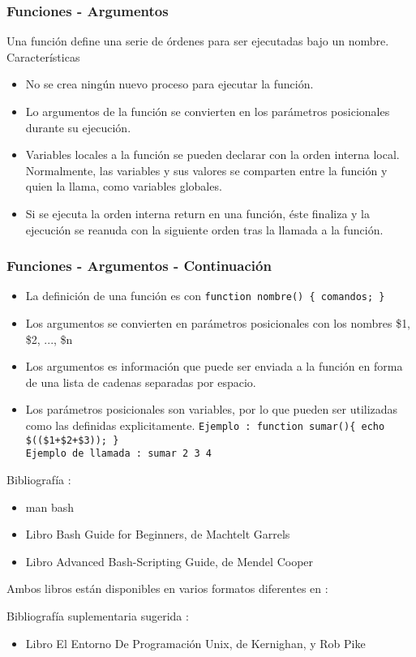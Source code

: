 \documentclass{beamer}
\begin{document}
\begin{frame}
\frametitle{Funciones - Argumentos}
       Una  función define una serie de órdenes para ser ejecutadas bajo un nombre. Características

\begin{itemize}
\item No  se crea ningún nuevo proceso para ejecutar la función.
\item Lo argumentos de  la  función  se
       convierten  en los parámetros posicionales durante su ejecución.
\item 
       Variables  locales  a la función se pueden declarar con la orden interna local.  
Normalmente, las
       variables y sus valores se comparten entre la función y quien la llama, como variables globales.

\item
       Si se ejecuta la orden interna return en una función, éste finaliza y la ejecución se reanuda con
       la  siguiente  orden tras la llamada a la función. 

\end{itemize}
\end{frame}

\begin{frame}
\frametitle{Funciones - Argumentos - Continuación}
\begin{itemize}
\item La definición de una función es con \texttt{function nombre() \{ comandos; \} }
\item Los argumentos se convierten en parámetros posicionales con los nombres \$1, \$2, ..., \$n
\item Los argumentos es información que puede ser enviada a la función en forma de una lista de cadenas separadas por espacio.\\ 
\item Los parámetros posicionales son variables, por lo que pueden ser utilizadas como las definidas explicitamente.
\texttt{Ejemplo : function sumar()\{ echo \$((\$1+\$2+\$3)); \} }\\ 
\texttt{Ejemplo de llamada : sumar 2 3 4 }
\end{itemize}
\end{frame}






\begin{frame}
Bibliografía : 
\begin{itemize}
\item man bash
\item Libro Bash Guide for Beginners, de Machtelt Garrels 
\item Libro Advanced Bash-Scripting Guide, de Mendel Cooper
\end{itemize}

Ambos libros están disponibles en varios formatos diferentes en :

Bibliografía suplementaria sugerida : 
\begin{itemize}
\item Libro El Entorno De Programación Unix, de Kernighan, y Rob Pike
\end{itemize}

\end{frame}
\end{document}
